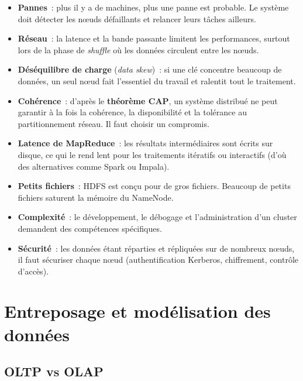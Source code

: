 \begin{itemize}
	\item \textbf{Pannes}~: plus il y a de machines, plus une panne est probable. Le système doit détecter les nœuds défaillants et relancer leurs tâches ailleurs.
	\item \textbf{Réseau}~: la latence et la bande passante limitent les performances, surtout lors de la phase de \textit{shuffle} où les données circulent entre les nœuds.
	\item \textbf{Déséquilibre de charge} (\textit{data skew})~: si une clé concentre beaucoup de données, un seul nœud fait l'essentiel du travail et ralentit tout le traitement.
	\item \textbf{Cohérence}~: d'après le \textbf{théorème CAP}, un système distribué ne peut garantir à la fois la cohérence, la disponibilité et la tolérance au partitionnement réseau. Il faut choisir un compromis.
	\item \textbf{Latence de MapReduce}~: les résultats intermédiaires sont écrits sur disque, ce qui le rend lent pour les traitements itératifs ou interactifs (d'où des alternatives comme Spark ou Impala).
	\item \textbf{Petits fichiers}~: HDFS est conçu pour de gros fichiers. Beaucoup de petits fichiers saturent la mémoire du NameNode.
	\item \textbf{Complexité}~: le développement, le débogage et l'administration d'un cluster demandent des compétences spécifiques.
	\item \textbf{Sécurité}~: les données étant réparties et répliquées sur de nombreux nœuds, il faut sécuriser chaque nœud (authentification Kerberos, chiffrement, contrôle d'accès).
\end{itemize}

\newpage
\section{Entreposage et modélisation des données}\label{sec:modelisation}

\subsection{OLTP vs OLAP}

